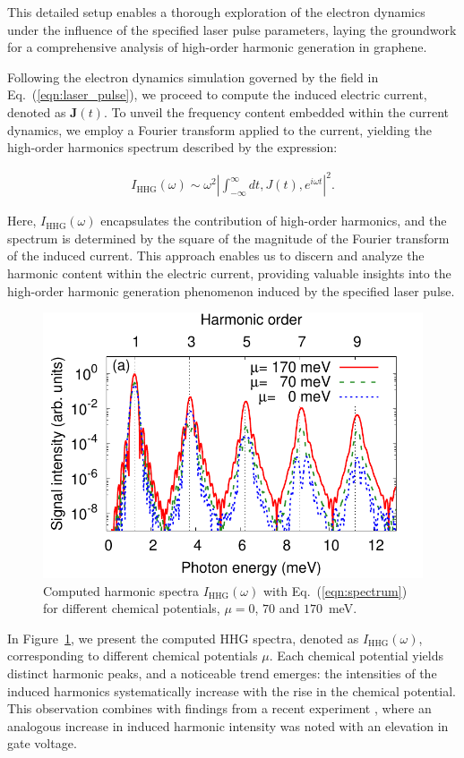 This detailed setup enables a thorough exploration of the electron dynamics under the influence of the specified laser pulse parameters, laying the groundwork for a comprehensive analysis of high-order harmonic generation in graphene.

Following the electron dynamics simulation governed by the field in Eq.~(\ref{eqn:laser_pulse}), we proceed to compute the induced electric current, denoted as $\mathbf J(t)$. To unveil the frequency content embedded within the current dynamics, we employ a Fourier transform applied to the current, yielding the high-order harmonics spectrum described by the expression:

\begin{align}
	I_{\mathrm{HHG}}(\omega)\sim \omega^2 \left | \int^{\infty}_{-\infty} dt , J(t) , e^{i\omega t} \right |^2.
	\label{eqn:spectrum}
\end{align}

Here, $I_{\mathrm{HHG}}(\omega)$ encapsulates the contribution of high-order harmonics, and the spectrum is determined by the square of the magnitude of the Fourier transform of the induced current. This approach enables us to discern and analyze the harmonic content within the electric current, providing valuable insights into the high-order harmonic generation phenomenon induced by the specified laser pulse.

\begin{figure}[htbp]
	\centering
	\includegraphics[width=0.8\linewidth]{pic/hhg_mu.pdf}
	\caption{\label{fig:hhg_mu}
		Computed harmonic spectra $I_{\mathrm{HHG}}(\omega)$ with Eq.~(\ref{eqn:spectrum}) for different
		chemical potentials, $\mu = 0$, $70$ and $170$~meV.}
\end{figure}

In Figure~\ref{fig:hhg_mu}, we present the computed HHG spectra, denoted as $I_{\mathrm{HHG}}(\omega)$, corresponding to different chemical potentials $\mu$. Each chemical potential yields distinct harmonic peaks, and a noticeable trend emerges: the intensities of the induced harmonics systematically increase with the rise in the chemical potential. This observation combines with findings from a recent experiment \cite{kovalev2021electrical}, where an analogous increase in induced harmonic intensity was noted with an elevation in gate voltage.

